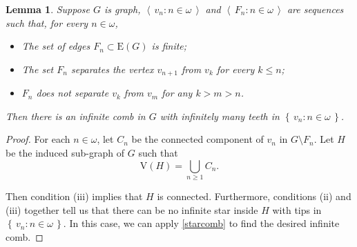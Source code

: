\documentclass[10pt]{article}
\newcommand{\myref}[1]{\hyperref[#1]{\namecref{#1} \ref{#1}}}
\numberwithin{equation}{subsection}
\newtheorem{lemma}[equation]{Lemma}
\theoremstyle{remark}
\newcommand{\set}[1]{\left\{\, {#1} \,\right\}}
\newcommand{\seq}[1]{{\left\langle \, {#1} \,\right\rangle}}
\begin{document}
\begin{lemma}\label{LEMMA_JustCombLemma}
    Suppose $G$ is graph, $\seq{v_n:n\in\omega}$ and $\seq{F_n:n\in\omega}$ are sequences such that, for every $n\in\omega$, 
    \begin{itemize}
        \item[(i)] The set of edges $F_n\subset \mathrm{E}(G)$ is finite;
        \item[(ii)] The set $F_n$ separates the vertex $v_{n+1}$ from $v_k$ for every $k\le n$;
        \item[(iii)] $F_n$ does not separate $v_{k}$ from $v_{m}$ for any $k>m>n$.
    \end{itemize}
     Then there is an infinite comb in $G$ with infinitely many teeth in $\set{v_n:n\in\omega}$.
\end{lemma}
\begin{proof}
    For each $n\in\omega$, let $C_n$ be the connected component of $v_n$ in $G\setminus F_n$. Let $H$ be the induced sub-graph of $G$ such that 
    \[\mathrm{V}(H) = \bigcup_{n\ge 1}C_n.\]

    Then condition (iii) implies that $H$ is connected. Furthermore, conditions (ii) and (iii) together tell us that there can be no infinite star inside $H$ with tips in $\set{v_n:n\in\omega}$. In this case, we can apply \myref{starcomb} to find the desired infinite comb.
\end{proof}
\end{document}
